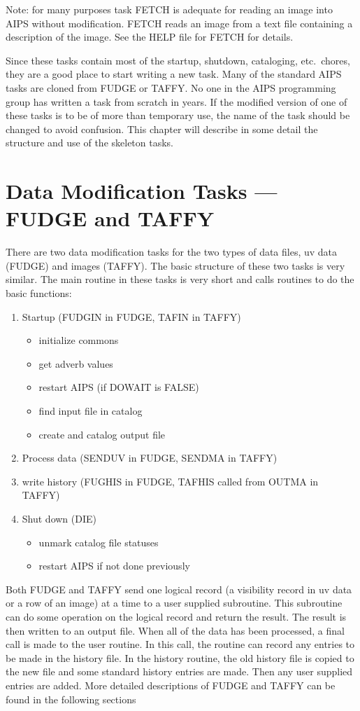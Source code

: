 Note: for many purposes task FETCH is adequate for reading an image
into AIPS without modification.  FETCH reads an image from a text file
containing a description of the image.  See the HELP file for FETCH
for details.

 Since these tasks contain most of the startup, shutdown, cataloging,
etc.~chores, they are a good place to start writing a new task.  Many
of the standard AIPS tasks are cloned from FUDGE or TAFFY.  No one in
the AIPS programming group has written a task from scratch in years.
If the modified version of one of these tasks is to be of more than
temporary use, the name of the task should be changed to avoid
confusion.  This chapter will describe in some detail the structure
and use of the skeleton tasks.


\section{Data Modification Tasks --- FUDGE and TAFFY}
 There are two data modification tasks for the two types of data
files, uv data (FUDGE) and images (TAFFY).  The basic structure of
these two tasks is very similar.  The main routine in these tasks is
very short and calls routines to do the basic functions:
\begin{enumerate} %
\item Startup (FUDGIN in FUDGE, TAFIN in TAFFY)
\begin{itemize} %
\item initialize commons
\item get adverb values
\item restart AIPS (if DOWAIT is FALSE)
\item find input file in catalog
\item create and catalog output file
\end{itemize} %
\item Process data (SENDUV in FUDGE, SENDMA in TAFFY)
\item write history (FUGHIS in FUDGE, TAFHIS called from OUTMA in TAFFY)
\item Shut down (DIE)
\begin{itemize} %
\item unmark catalog file statuses
\item restart AIPS if not done previously
\end{itemize} %

\end{enumerate} %
 Both FUDGE and TAFFY send one logical record (a visibility record in
uv data or a row of an image) at a time to a user supplied subroutine.
This subroutine can do some operation on the logical record and return
the result.  The result is then written to an output file.  When all
of the data has been processed, a final call is made to the user
routine.  In this call, the routine can record any entries to be made
in the history file.  In the history routine, the old history file is
copied to the new file and some standard history entries are made.
Then any user supplied entries are added.  More detailed descriptions
of FUDGE and TAFFY can be found in the following sections

